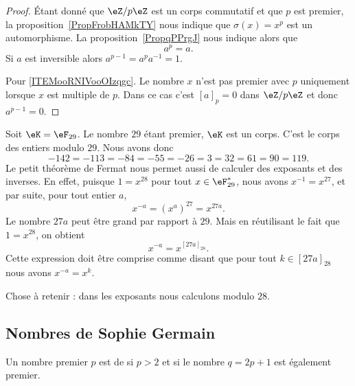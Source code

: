 \begin{proof}
	Étant donné que \( \eZ/p\eZ\) est un corps commutatif et que \( p\) est premier, la proposition~\ref{PropFrobHAMkTY} nous indique que \( \sigma(x)=x^p\) est un automorphisme. La proposition~\ref{PropqPPrgJ} nous indique alors que
	\begin{equation}
		a^p=a.
	\end{equation}
	Si \( a\) est inversible alors \( a^{p-1}=a^pa^{-1}=1\).

	Pour \ref{ITEMooRNIVooOIzqgc}. Le nombre \( x\) n'est pas premier avec \( p\) uniquement lorsque \( x\) est multiple de \( p\). Dans ce cas c'est \( [a]_p=0\) dans \( \eZ/p\eZ\) et donc \( a^{p-1}=0\).
\end{proof}

\begin{example}
	Soit \( \eK=\eF_{29}\). Le nombre \( 29\) étant premier, \( \eK\) est un corps. C'est le corps des entiers modulo \( 29\). Nous avons donc
	\begin{equation}
		-142=-113=-84=-55=-26=3=32=61=90=119.
	\end{equation}
	Le petit théorème de Fermat nous permet aussi de calculer des exposants et des inverses. En effet, puisque \( 1=x^{28}\) pour tout \( x \in \eF_{29}^* \), nous avons \( x^{-1}=x^{27}\), et par suite, pour tout entier \( a \),
	\begin{equation}
		x^{-a}=(x^a)^{27}=x^{27a}.
	\end{equation}
	Le nombre \( 27 a\) peut être grand par rapport à \( 29\). Mais en réutilisant le fait que \( 1=x^{28}\), on obtient
	\begin{equation}
		x^{-a}=x^{[27a]_{28}}.
	\end{equation}
	Cette expression doit être comprise comme disant que pour tout \( k\in [27a]_{28}\) nous avons \( x^{-a}=x^{k}\).

	Chose à retenir : dans les exposants nous calculons modulo \( 28\).
\end{example}

\subsection{Nombres de Sophie Germain}


\begin{definition}      \label{DEFooCVFJooKCdVVD}
	Un nombre premier \( p\) est de  si \( p>2\) et si le nombre \( q=2p+1\) est également premier.
\end{definition}

